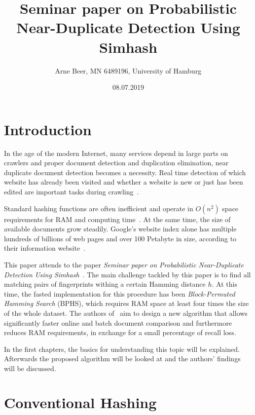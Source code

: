 \documentclass[12pt,a4paper,DIV=calc]{scrartcl}
\begin{document}
\title{Seminar paper on Probabilistic Near-Duplicate Detection Using Simhash}
\author{Arne Beer, MN 6489196, University of Hamburg}
\date{08.07.2019}

\maketitle


\section{Introduction}

In the age of the modern Internet, many services depend in large parts on crawlers and proper document detection and duplication elimination, near duplicate document detection becomes a necessity.
Real time detection of which website has already been visited and whether a website is new or just has been edited are important tasks during crawling~\cite{paper:scaling_six_billion}.

Standard hashing functions are often inefficient and operate in $O(n^2)$ space requirements for RAM and computing time~\cite{book:hashing}.
At the same time, the size of available documents grow steadily.
Google's website index alone has multiple hundreds of billions of web pages and over 100 Petabyte in size, according to their information website~\cite{info:google_stats}.

This paper attends to the paper \emph{Seminar paper on Probabilistic Near-Duplicate Detection Using Simhash}~\cite{inproc:main}.
The main challenge tackled by this paper is to find all matching pairs of fingerprints withing a certain Hamming distance $h$.
At this time, the fasted implementation for this procedure has been \emph{Block-Permuted Hamming Search} (BPHS), which requires RAM space at least four times the size of the whole dataset.
The authors of~\cite{inproc:main} aim to design a new algorithm that allows significantly faster online and batch document comparison and furthermore reduces RAM requirements, in exchange for a small percentage of recall loss.

In the first chapters, the basics for understanding this topic will be explained.
Afterwards the proposed algorithm will be looked at and the authors' findings will be discussed.

\section{Conventional Hashing}
\end{document}
